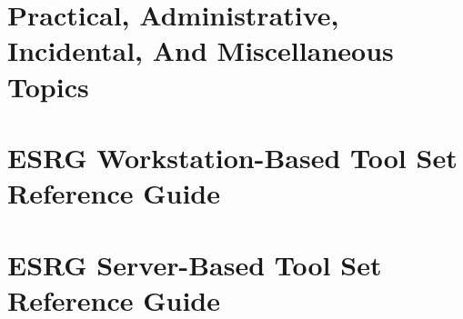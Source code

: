 \documentclass[letterpaper,10pt,titlepage]{custbook}
\begin{document}








\part{Practical, Administrative, Incidental, And Miscellaneous Topics}













\part{ESRG Workstation-Based Tool Set Reference Guide}













\part{ESRG Server-Based Tool Set Reference Guide}
\end{document}
